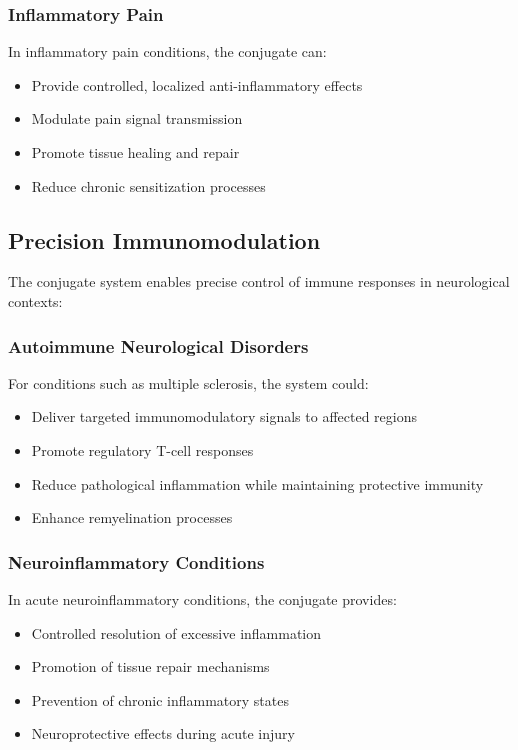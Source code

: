 \documentclass[11pt,a4paper]{article}
\begin{document}
\subsubsection{Inflammatory Pain}

In inflammatory pain conditions, the conjugate can:
\begin{itemize}
\item Provide controlled, localized anti-inflammatory effects
\item Modulate pain signal transmission
\item Promote tissue healing and repair
\item Reduce chronic sensitization processes
\end{itemize}

\subsection{Precision Immunomodulation}

The conjugate system enables precise control of immune responses in neurological contexts:

\subsubsection{Autoimmune Neurological Disorders}

For conditions such as multiple sclerosis, the system could:
\begin{itemize}
\item Deliver targeted immunomodulatory signals to affected regions
\item Promote regulatory T-cell responses
\item Reduce pathological inflammation while maintaining protective immunity
\item Enhance remyelination processes
\end{itemize}

\subsubsection{Neuroinflammatory Conditions}

In acute neuroinflammatory conditions, the conjugate provides:
\begin{itemize}
\item Controlled resolution of excessive inflammation
\item Promotion of tissue repair mechanisms
\item Prevention of chronic inflammatory states
\item Neuroprotective effects during acute injury
\end{itemize}
\end{document}
